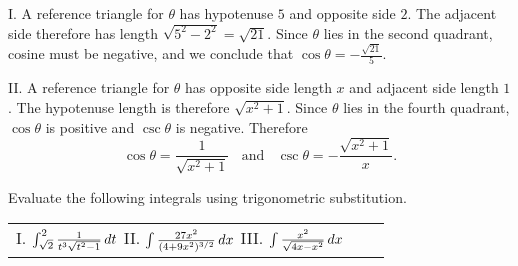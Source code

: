 \documentclass[]{ximera}
\begin{document}
\begin{freeResponse}
I. A reference triangle for $\theta$ has hypotenuse $5$ and opposite side $2$. The adjacent side therefore has length $\sqrt{5^2-2^2} = \sqrt{21}$. Since $\theta$ lies in the second quadrant, cosine must be negative, and we conclude that $\cos\theta = -\frac{\sqrt{21}}{5}$.

II. A reference triangle for $\theta$ has opposite side length $x$ and adjacent side length $1$. The hypotenuse length is therefore $\sqrt{x^2+1}$. Since $\theta$ lies in the fourth quadrant, $\cos \theta$ is positive and $\csc \theta$ is negative. Therefore
$$
\cos \theta = \frac{1}{\sqrt{x^2+1}} \;\; \mbox{ and } \;\; \csc \theta = -\frac{\sqrt{x^2+1}}{x}.
$$
\end{freeResponse}

\begin{problem}
Evaluate the following integrals using trigonometric substitution.
\begin{center}
\begin{tabular}{lll}
I. $\int_{\sqrt{2}}^2 \frac{1}{t^3 \sqrt{t^2 -1}} \mathop{}\!d t$ \hspace{.2in} II. $\int \frac{27 x^2}{(4+9x^2)^{3/2}} \mathop{}\!d x$ \hspace{.2in} III. $\int \frac{x^2}{\sqrt{4x-x^2}} \mathop{}\!d x$
\end{tabular}
\end{center}
\end{problem}
\end{document}
